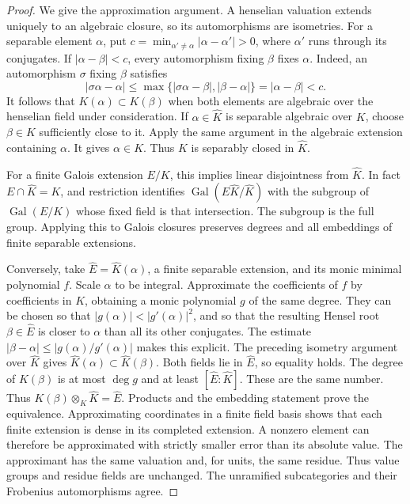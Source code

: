 \begin{proof}
We give the approximation argument. A henselian valuation extends
uniquely to an algebraic closure, so its automorphisms are isometries.
For a separable element \(\alpha\), put
\(c=\min_{\alpha'\neq\alpha}|\alpha-\alpha'|>0\), where
\(\alpha'\) runs through its conjugates. If \(|\alpha-\beta|<c\),
every automorphism fixing \(\beta\) fixes \(\alpha\).
Indeed, an automorphism \(\sigma\) fixing \(\beta\) satisfies
\[
 |\sigma\alpha-\alpha|
 \leq\max\{|\sigma\alpha-\beta|,|\beta-\alpha|\}
 =|\alpha-\beta|<c.
\]
It follows that \(K(\alpha)\subset K(\beta)\) when both elements
are algebraic over the henselian field under consideration.
If \(\alpha\in\widehat K\) is separable algebraic over \(K\),
choose \(\beta\in K\) sufficiently close to it. Apply the same
argument in the algebraic extension containing \(\alpha\).
It gives \(\alpha\in K\). Thus \(K\) is separably closed in
\(\widehat K\).

For a finite Galois extension \(E/K\), this implies linear
disjointness from \(\widehat K\). In fact
\(E\cap\widehat K=K\), and restriction identifies
\(\operatorname{Gal}(E\widehat K/\widehat K)\) with the subgroup
of \(\operatorname{Gal}(E/K)\) whose fixed field is that
intersection. The subgroup is the full group. Applying this to
Galois closures preserves degrees and all embeddings of finite
separable extensions.

Conversely, take \(\widehat E=\widehat K(\alpha)\), a finite
separable extension, and its monic minimal polynomial \(f\).
Scale \(\alpha\) to be integral. Approximate the coefficients of
\(f\) by coefficients in \(K\), obtaining a monic polynomial
\(g\) of the same degree. They can be chosen so that
\(|g(\alpha)|<|g'(\alpha)|^2\), and so that the resulting
Hensel root \(\beta\in\widehat E\) is closer to \(\alpha\)
than all its other conjugates. The estimate
\(|\beta-\alpha|\leq|g(\alpha)/g'(\alpha)|\) makes this explicit.
The preceding isometry argument over \(\widehat K\) gives
\(\widehat K(\alpha)\subset\widehat K(\beta)\).
Both fields lie in \(\widehat E\), so equality holds.
The degree of \(K(\beta)\) is at most \(\deg g\) and at least
\([\widehat E:\widehat K]\). These are the same number.
Thus \(K(\beta)\otimes_K\widehat K=\widehat E\).
Products and the embedding statement prove the equivalence.
Approximating coordinates in a finite field basis shows that each
finite extension is dense in its completed extension. A nonzero element
can therefore be approximated with strictly smaller error than its
absolute value. The approximant has the same valuation and, for units,
the same residue. Thus value groups and residue fields are unchanged.
The unramified subcategories and their Frobenius automorphisms agree.
\end{proof}

